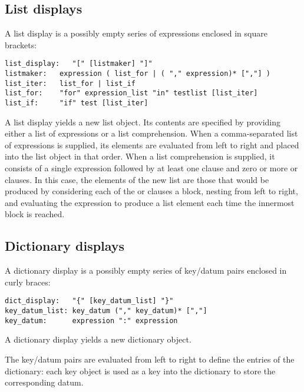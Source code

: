 \subsection{List displays\label{lists}}

A list display is a possibly empty series of expressions enclosed in
square brackets:

\begin{verbatim}
list_display:   "[" [listmaker] "]"
listmaker:   expression ( list_for | ( "," expression)* [","] )
list_iter:   list_for | list_if
list_for:    "for" expression_list "in" testlist [list_iter]
list_if:     "if" test [list_iter]
\end{verbatim}

A list display yields a new list object.  Its contents are specified
by providing either a list of expressions or a list comprehension.
When a comma-separated list of expressions is supplied, its elements are
evaluated from left to right and placed into the list object in that
order.  When a list comprehension is supplied, it consists of a
single expression followed by at least one  clause and zero or
more  or  clauses.  In this 
case, the elements of the new list are those that would be produced
by considering each of the  or  clauses a block,
nesting from 
left to right, and evaluating the expression to produce a list element
each time the innermost block is reached.

\subsection{Dictionary displays\label{dict}}

A dictionary display is a possibly empty series of key/datum pairs
enclosed in curly braces:

\begin{verbatim}
dict_display:   "{" [key_datum_list] "}"
key_datum_list: key_datum ("," key_datum)* [","]
key_datum:      expression ":" expression
\end{verbatim}

A dictionary display yields a new dictionary object.

The key/datum pairs are evaluated from left to right to define the
entries of the dictionary: each key object is used as a key into the
dictionary to store the corresponding datum.

